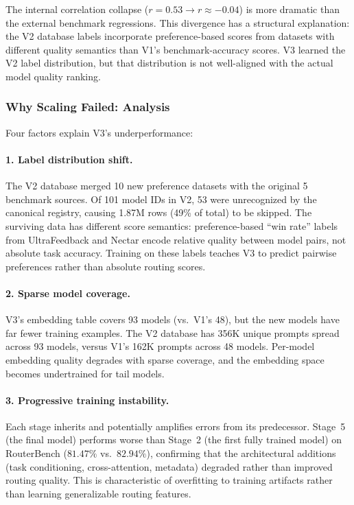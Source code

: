 The internal correlation collapse ($r = 0.53 \to r \approx -0.04$) is more dramatic than the external benchmark regressions. This divergence has a structural explanation: the V2 database labels incorporate preference-based scores from datasets with different quality semantics than V1's benchmark-accuracy scores. V3 learned the V2 label distribution, but that distribution is not well-aligned with the actual model quality ranking.

\subsubsection{Why Scaling Failed: Analysis}

Four factors explain V3's underperformance:

\paragraph{1. Label distribution shift.} The V2 database merged 10 new preference datasets with the original 5 benchmark sources. Of 101 model IDs in V2, 53 were unrecognized by the canonical registry, causing 1.87M rows (49\% of total) to be skipped. The surviving data has different score semantics: preference-based ``win rate'' labels from UltraFeedback and Nectar encode relative quality between model pairs, not absolute task accuracy. Training on these labels teaches V3 to predict pairwise preferences rather than absolute routing scores.

\paragraph{2. Sparse model coverage.} V3's embedding table covers 93 models (vs.\ V1's 48), but the new models have far fewer training examples. The V2 database has 356K unique prompts spread across 93 models, versus V1's 162K prompts across 48 models. Per-model embedding quality degrades with sparse coverage, and the embedding space becomes undertrained for tail models.

\paragraph{3. Progressive training instability.} Each stage inherits and potentially amplifies errors from its predecessor. Stage~5 (the final model) performs worse than Stage~2 (the first fully trained model) on RouterBench ($81.47\%$ vs.\ $82.94\%$), confirming that the architectural additions (task conditioning, cross-attention, metadata) degraded rather than improved routing quality. This is characteristic of overfitting to training artifacts rather than learning generalizable routing features.

